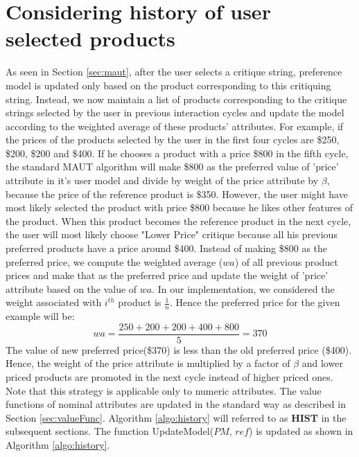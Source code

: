 \section{Considering history of user selected products}
\label{sec:hist}
As seen in Section \ref{sec:maut}, after the user selects a critique string, preference model is updated only based on the product corresponding to this critiquing string.
Instead, we now maintain a list of products corresponding to the critique strings selected by the user in previous interaction cycles and update the model according to the weighted average of these products' attributes.
For example, if the prices of the products selected by the user in the first four cycles are \$250, \$200, \$200 and \$400.
If he chooses a product with a price \$800 in the fifth cycle, the standard MAUT algorithm will make \$800 as the preferred value of 'price' attribute in it's user model and divide by weight of the price attribute by $\beta$, because the price of the reference product is \$350.
However, the user might have most likely selected the product with price \$800 because he likes other features of the product.
When this product becomes the reference product in the next cycle, the user will most likely choose "Lower Price" critique because all his previous preferred products have a price around \$400.
Instead of making \$800 as the preferred price, we compute the weighted average ($wa$) of all previous product prices and make that as the preferred price and update the weight of 'price' attribute based on the value of $wa$.
In our implementation, we considered the weight associated with $i^{th}$ product is $\frac{1}{n}$. 
Hence the preferred price for the given example will be:
\begin{equation}
wa = \frac{250+200+200+400+800} {5} = 370
\end{equation}
The value of new preferred price(\$370) is less than the old preferred price (\$400).
Hence, the weight of the price attribute is multiplied by a factor of $\beta$ and lower priced products are promoted in the next cycle instead of higher priced ones.
Note that this strategy is applicable only to numeric attributes.
The value functions of nominal attributes are updated in the standard way as described in Section \ref{sec:valueFunc}.
Algorithm \ref{algo:history} will referred to as \textbf{HIST} in the subsequent sections.
The function UpdateModel($PM$, $ref$) is updated as shown in Algorithm 
\ref{algo:history}.


